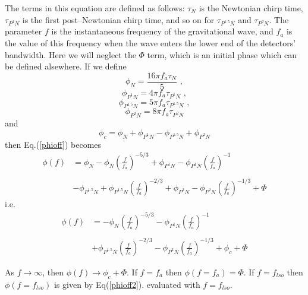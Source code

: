 \documentclass[12pt]{article}
\begin{document}
The terms in this equation are defined as follows:
$\tau_{N}$ is the Newtonian chirp time, $\tau_{P^{1}N}$ is the first post--Newtonian chirp time, and so on for $\tau_{P^{1.5}N}$ and $\tau_{P^{2}N}$. The parameter $f$ is the instantaneous frequency of the gravitational wave, and $f_{a}$ is the value of this frequency when the wave enters the lower end of the detectors' bandwidth.
Here we will neglect the $\Phi$ term, which is an initial phase which can be defined alsewhere. If we define
\begin{equation}
\phi_{N} = \frac{16 \pi f_{a} \tau_{N}}{5} \,\,,
\end{equation}
\begin{equation}
\phi_{P^{1}N} = 4 \pi f_{a} \tau_{P^{1}N} \,\,,
\end{equation}
\begin{equation}
\phi_{P^{1.5}N} = 5 \pi f_{a} \tau_{P^{1.5}N} \,\,,
\end{equation}
\begin{equation}
\phi_{P^{2}N} = 8 \pi f_{a} \tau_{P^{2}N}
\end{equation}
and 
\begin{equation}
\phi_{c} = \phi_{N} + \phi_{P^{1}N} - \phi_{P^{1.5}N} + \phi_{P^{2}N}
\end{equation}
then Eq.(\ref{phioff}) becomes
\begin{equation}
\begin{split}
\phi(f) & = \phi_{N} - \phi_{N}\left( \frac{f}{f_{a}} \right)^{-5/3} + \phi_{P^{1}N} - \phi_{P^{1}N} \left( \frac{f}{f_{a}} \right)^{-1} \\
      &      \\
      & - \phi_{P^{1.5}N} + \phi_{P^{1.5}N} \left( \frac{f}{f_{a}} \right)^{-2/3} + \phi_{P^{2}N} - \phi_{P^{2}N} \left( \frac{f}{f_{a}} \right)^{-1/3} + \Phi
\end{split}
\end{equation}
i.e.\
\begin{equation}
\begin{split}
\phi(f) & = - \phi_{N}\left( \frac{f}{f_{a}} \right)^{-5/3}- \phi_{P^{1}N} \left( \frac{f}{f_{a}} \right)^{-1} \\
   &   \\
   & + \phi_{P^{1.5}N} \left( \frac{f}{f_{a}} \right)^{-2/3} - \phi_{P^{2}N} \left( \frac{f}{f_{a}} \right)^{-1/3} + \phi_{c} + \Phi
\end{split}
\label{phioff2}
\end{equation}

As $f \rightarrow \infty$, then $\phi(f) \rightarrow \phi_{c} + \Phi$. If $f=f_{a}$ then $\phi(f=f_{a}) = \Phi$. If $f=f_{lso}$ then $\phi(f=f_{lso})$ is given by Eq(\ref{phioff2}). evaluated with $f=f_{lso}$.
\end{document}

